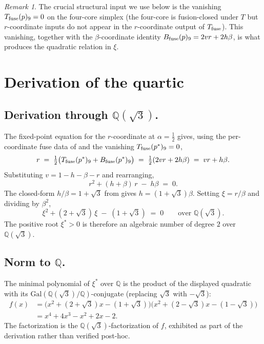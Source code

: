 \documentclass[11pt,reqno]{amsart}
\theoremstyle{plain}
\theoremstyle{definition}
\theoremstyle{remark}
\newtheorem*{remark}{Remark}
\newcommand{\Q}{\mathbb{Q}}
\newcommand{\TS}{T}
\newcommand{\BH}{B}
\begin{document}
\begin{remark}
The crucial structural input we use below is the vanishing
$\TS_{\rm fuse}(p)_{9} = 0$ on the four-core simplex (the four-core is
fusion-closed under $\TS$ but $r$-coordinate inputs do not appear in the
$r$-coordinate output of $\TS_{\rm fuse}$). This vanishing, together
with the $\beta$-coordinate identity
$\BH_{\rm fuse}(p)_{9} = 2vr + 2h\beta$, is what produces the quadratic
relation in $\xi$.
\end{remark}

\section{Derivation of the quartic}
\label{sec:derivation}

\subsection{Derivation through $\Q(\sqrt{3})$.}

The fixed-point equation for the $r$-coordinate at $\alpha = \tfrac12$
gives, using the per-coordinate fuse data of
\cite{SandersGishFourCore} and the vanishing
$\TS_{\rm fuse}(p^{*})_{9} = 0$,
\[
  r \;=\; \tfrac12\bigl(\TS_{\rm fuse}(p^{*})_{9} + \BH_{\rm fuse}(p^{*})_{9}\bigr)
        \;=\; \tfrac12(2vr + 2 h\beta)
        \;=\; vr + h\beta.
\]
Substituting $v = 1 - h - \beta - r$ and rearranging,
\[
  r^{2} + (h + \beta)\, r \;-\; h\beta \;=\; 0.
\]
The closed-form $h/\beta = 1 + \sqrt{3}$ from \cite{SandersGishFourCore}
gives $h = (1+\sqrt{3})\beta$. Setting $\xi = r/\beta$ and dividing by
$\beta^{2}$,
\[
  \xi^{2} + (2+\sqrt{3})\,\xi \;-\; (1+\sqrt{3}) \;=\; 0
  \qquad\text{over }\Q(\sqrt{3}).
\]
The positive root $\xi^{*} > 0$ is therefore an algebraic number of
degree $2$ over $\Q(\sqrt{3})$.

\subsection{Norm to $\Q$.}

The minimal polynomial of $\xi^{*}$ over $\Q$ is the product of the
displayed quadratic with its $\mathrm{Gal}(\Q(\sqrt{3})/\Q)$-conjugate
(replacing $\sqrt{3}$ with $-\sqrt{3}$):
\begin{align*}
  f(x)
  &= \bigl(x^{2} + (2+\sqrt{3})x - (1+\sqrt{3})\bigr)
     \bigl(x^{2} + (2-\sqrt{3})x - (1-\sqrt{3})\bigr) \\
  &= x^{4} + 4x^{3} - x^{2} + 2x - 2.
\end{align*}
The factorization is the $\Q(\sqrt{3})$-factorization of $f$,
exhibited as part of the derivation rather than verified post-hoc.
\end{document}

